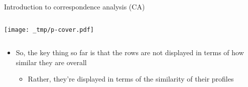\documentclass[
  ignorenonframetext,
  aspectratio=169]{beamer}
\providecommand{\tightlist}{%
  \setlength{\itemsep}{0pt}\setlength{\parskip}{0pt}}\usepackage{longtable,booktabs,array}
\begin{document}
\begin{frame}{Introduction to correspondence analysis (CA)}
\begin{columns}[T]
\begin{column}{0.525\textwidth}
\vspace{-1cm}

\texttt{[image: \_tmp/p-cover.pdf]}
\end{column}
\end{columns}

\begin{itemize}
\tightlist
\item
  So, the key thing so far is that the rows are not displayed in terms
  of how similar they are overall

  \begin{itemize}
  \tightlist
  \item
    Rather, they're displayed in terms of the similarity of their
    profiles
  \end{itemize}
\end{itemize}
\end{frame}
\end{document}
